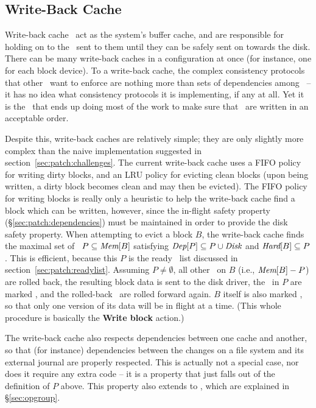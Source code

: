 \subsection{Write-Back Cache}
\label{sec:using:wbcache}

Write-back cache \modules\ act as the system's buffer cache, and are responsible
for holding on to the \chdescs\ sent to them until they can be safely sent on
towards the disk. There can be many write-back caches in a configuration at once
(for instance, one for each block device). To a write-back cache, the complex
consistency protocols that other \modules\ want to enforce are nothing more than
sets of dependencies among \chdescs\ -- it has no idea what consistency
protocols it is implementing, if any at all. Yet it is the \module\ that ends up
doing most of the work to make sure that \chdescs\ are written in an acceptable
order.

Despite this, write-back caches are relatively simple; they are only slightly
more complex than the naive implementation suggested in
section~\ref{sec:patch:challenges}. The current write-back cache uses a FIFO
policy for writing dirty blocks, and an LRU policy for evicting clean blocks
(upon being written, a dirty block becomes clean and may then be evicted).
%
The FIFO policy for writing blocks is really only a heuristic to help the
write-back cache find a block which can be written, however, since the in-flight
safety property (\S\ref{sec:patch:dependencies}) must be maintained in order to
provide the disk safety property. When attempting to evict a block $B$, the
write-back cache finds the maximal set of \chdescs\ $P \subseteq \PMem[B]$
satisfying
%
$\PDepset{P} \subseteq P \cup \PDisk$ and $\PHard[B] \subseteq P$.
%
This is efficient, because this $P$ is the ready \chdesc\ list discussed in
section~\ref{sec:patch:readylist}.
%
Assuming $P \neq \emptyset$, all other \chdescs\ on $B$ (i.e., $\PMem[B] - P$)
are rolled back, the resulting block data is sent to the disk driver, the
\chdescs\ in $P$ are marked \PInfst, and the rolled-back \chdescs\ are rolled
forward again. $B$ itself is also marked \PInfst, so that only one version of
its data will be in flight at a time. (This whole procedure is basically the
\textbf{Write block} action.)

The write-back cache also respects dependencies between one cache and another,
so that (for instance) dependencies between the changes on a file system and its
external journal are properly respected. This is actually not a special case,
nor does it require any extra code -- it is a property that just falls out of
the definition of $P$ above. This property also extends to \opgroups, which are
explained in \S\ref{sec:opgroup}.
